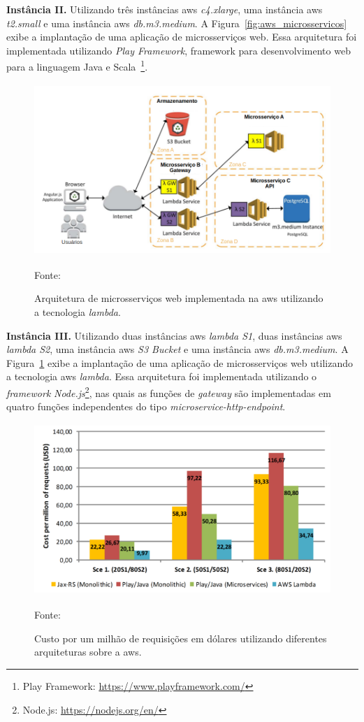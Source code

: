 \textbf{Instância II.} Utilizando três instâncias \ac{aws} \textit{c4.xlarge}, uma instância \ac{aws} \textit{t2.small} e uma instância \ac{aws} \textit{db.m3.medium}.
%
A Figura~\ref{fig:aws_microsservicos} exibe a implantação de uma aplicação de microsserviços web. Essa arquitetura foi implementada utilizando \textit{Play Framework}, framework para desenvolvimento web para a linguagem Java e Scala~\footnote{Play Framework: \url{https://www.playframework.com/}}.



\begin{figure}[htb!]
\caption{Arquitetura de microsserviços web implementada na \ac{aws} utilizando a tecnologia \textit{lambda}.}
\label{fig:aws_lambda}
\includegraphics[height=6.5cm]{img/cap2/aws_lambda.png}
\centering

Fonte:~\cite{7515686}
\end{figure}

\textbf{Instância III.} Utilizando duas instâncias \ac{aws} \textit{lambda S1}, duas instâncias \ac{aws} \textit{lambda S2}, uma instância \ac{aws} \textit{S3 Bucket} e uma instância \ac{aws} \textit{db.m3.medium}.
%
A Figura~\ref{fig:aws_lambda} exibe a implantação de uma aplicação de microsserviços web utilizando a tecnologia \ac{aws} \textit{lambda}. Essa arquitetura foi implementada utilizando o \textit{framework} \textit{Node.js}\footnote{Node.js: \url{https://nodejs.org/en/}}, nas quais as funções de \textit{gateway} são implementadas em quatro funções independentes do tipo \textit{microservice-http-endpoint}.



\begin{figure}[htb!]
\caption{Custo por um milhão de requisições em dólares utilizando diferentes arquiteturas sobre a \ac{aws}.}
\label{fig:custo_aws}
\includegraphics[height=6.5cm]{img/cap2/custo_aws.png}
\centering

Fonte:~\cite{7515686}
\end{figure}



